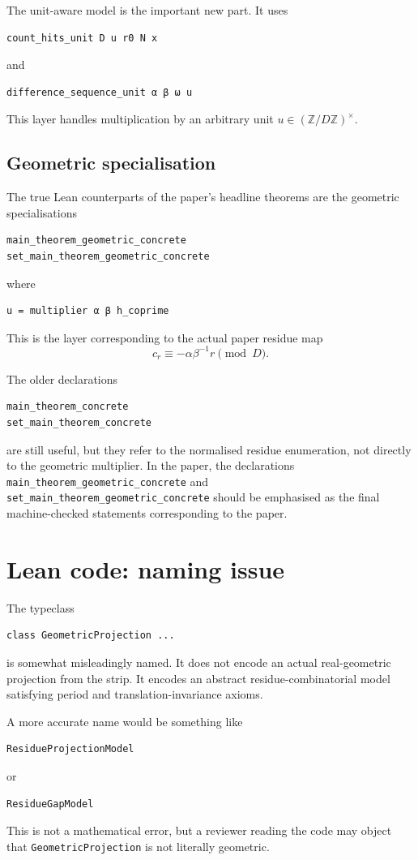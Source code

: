 \documentclass[11pt]{article}
\begin{document}
The unit-aware model is the important new part.  It uses
\begin{lstlisting}[language=Lean]
count_hits_unit D u r0 N x
\end{lstlisting}
and
\begin{lstlisting}[language=Lean]
difference_sequence_unit α β ω u
\end{lstlisting}
This layer handles multiplication by an arbitrary unit \(u\in(\mathbb Z/D\mathbb Z)^\times\).

\subsection{Geometric specialisation}

The true Lean counterparts of the paper's headline theorems are the geometric
specialisations
\begin{lstlisting}[language=Lean]
main_theorem_geometric_concrete
set_main_theorem_geometric_concrete
\end{lstlisting}
where
\begin{lstlisting}[language=Lean]
u = multiplier α β h_coprime
\end{lstlisting}
This is the layer corresponding to the actual paper residue map
\[
c_r\equiv -\alpha\beta^{-1}r\pmod D.
\]

The older declarations
\begin{lstlisting}[language=Lean]
main_theorem_concrete
set_main_theorem_concrete
\end{lstlisting}
are still useful, but they refer to the normalised residue enumeration, not
directly to the geometric multiplier.  In the paper, the declarations
\texttt{main\_theorem\_geometric\_concrete} and
\texttt{set\_main\_theorem\_geometric\_concrete} should be emphasised as the
final machine-checked statements corresponding to the paper.

\section{Lean code: naming issue}

The typeclass
\begin{lstlisting}[language=Lean]
class GeometricProjection ...
\end{lstlisting}
is somewhat misleadingly named.  It does not encode an actual real-geometric
projection from the strip.  It encodes an abstract residue-combinatorial model
satisfying period and translation-invariance axioms.

A more accurate name would be something like
\begin{lstlisting}[language=Lean]
ResidueProjectionModel
\end{lstlisting}
or
\begin{lstlisting}[language=Lean]
ResidueGapModel
\end{lstlisting}
This is not a mathematical error, but a reviewer reading the code may object
that \texttt{GeometricProjection} is not literally geometric.
\end{document}
